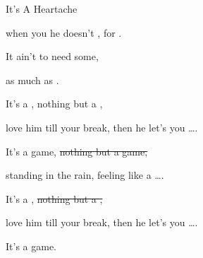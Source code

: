\begin{SBSong}{It's A Heartache}
\begin{SBVerse}
    when you  he doesn't , for .
        
    It ain't  to need some, 

    as much as   \quad {}.
  \end{SBVerse}
  \CBPageBrk
  \begin{SBVerse}
    It's a , nothing but a ,

    love him till your  break, then he let's you \ldots{}.

    It's a  game, \sout{nothing but a  game,}

    standing in the  rain, feeling like a \ldots{}.
    
    It's a , \sout{nothing but a ,}

    love him till your  break, then he let's you \ldots{}.
    
    It's a  game.
  \end{SBVerse}
\end{SBSong}
